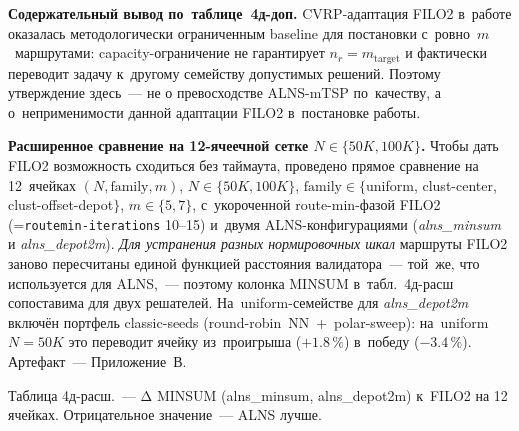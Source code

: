 \documentclass[a4paper,14pt]{extreport}
\makeatletter
\let\old@texttt\texttt
\renewcommand{\texttt}[1]{{\sloppy\hyphenchar\font=\m@ne\old@texttt{#1}}}
\makeatother
\begin{document}
\textbf{Содержательный вывод по~таблице~4д-доп.} CVRP-адаптация FILO2 в~работе оказалась методологически ограниченным baseline для постановки с~ровно~$m$~маршрутами: capacity-ограничение не гарантирует $n_r=m_\mathrm{target}$ и фактически переводит задачу к~другому семейству допустимых решений. Поэтому утверждение здесь~--- не о превосходстве ALNS-mTSP по~качеству, а о~неприменимости данной адаптации FILO2 в~постановке работы.

\medskip
\noindent\textbf{Расширенное сравнение на 12-ячеечной сетке $N\in\{50K,100K\}$.} Чтобы дать FILO2 возможность сходиться без таймаута, проведено прямое сравнение на 12~ячейках $(N,\text{family},m)$, $N\in\{50K,100K\}$, $\mathrm{family}\in\{$uniform, clust-center, clust-offset-depot$\}$, $m\in\{5,7\}$, с~укороченной route-min-фазой FILO2 (\texttt{routemin-iterations} 10--15) и~двумя ALNS-конфигурациями (\emph{alns\_minsum} и \emph{alns\_depot2m}). \emph{Для устранения разных нормировочных шкал} маршруты FILO2 заново пересчитаны единой функцией расстояния валидатора~--- той~же, что используется для ALNS,~--- поэтому колонка MINSUM в~табл.~4д-расш сопоставима для двух решателей. На~uniform-семействе для \emph{alns\_depot2m} включён портфель classic-seeds (round-robin~NN~+~polar-sweep): на~uniform $N=50K$ это переводит ячейку из~проигрыша ($+1.8\,\%$) в~победу ($-3.4\,\%$). Артефакт~--- Приложение~В.

\medskip
\noindent Таблица 4д-расш.~--- Δ MINSUM (alns\_minsum, alns\_depot2m) к~FILO2 на 12 ячейках. Отрицательное значение~--- ALNS лучше.
\end{document}

